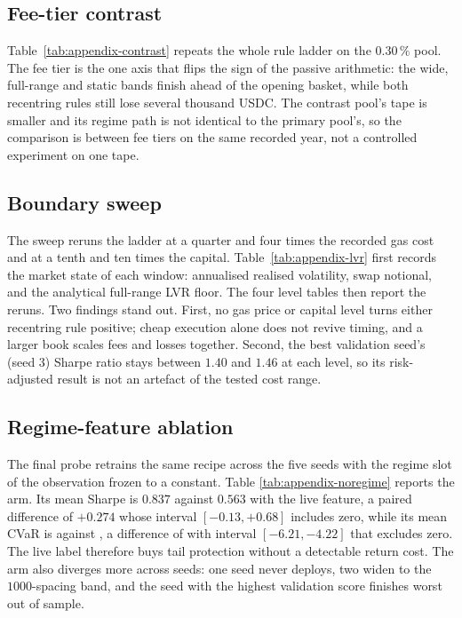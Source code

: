 

\subsection{Fee-tier contrast}

Table~\ref{tab:appendix-contrast} repeats the whole rule ladder on the
$0.30\,\%$ pool. The fee tier is the one axis that flips the sign of the
passive arithmetic: the wide, full-range and static bands finish ahead of the
opening basket, while both recentring rules still lose several thousand USDC.
The contrast pool's tape is smaller and its regime path is not identical to
the primary pool's, so the comparison is between fee tiers on the same
recorded year, not a controlled experiment on one tape.



\subsection{Boundary sweep}

The sweep reruns the ladder at a quarter and four times the recorded gas cost
and at a tenth and ten times the capital. Table~\ref{tab:appendix-lvr} first
records the market state of each window: annualised realised volatility,
swap notional, and the analytical full-range LVR floor. The four level tables
then report the reruns. Two findings stand out. First, no gas price or capital
level turns either recentring rule positive; cheap execution alone does not
revive timing, and a larger book scales fees and losses together. Second, the
best validation seed's (seed 3) Sharpe ratio stays between $1.40$ and $1.46$
at each level, so its risk-adjusted result is not an artefact of the tested
cost range.



\subsection{Regime-feature ablation}

The final probe retrains the same recipe across the five seeds with the regime
slot of the observation frozen to a constant. Table
\ref{tab:appendix-noregime} reports the arm. Its mean Sharpe is $0.837$ against
$0.563$ with the live feature, a paired difference of $+0.274$ whose interval
$[-0.13,+0.68]$ includes zero, while its mean CVaR is  against
, a difference of  with interval $[-6.21,-4.22]$ that
excludes zero. The live label therefore buys tail protection without a
detectable return cost. The arm also diverges more across seeds: one seed
never deploys, two widen to the $1000$-spacing band, and the seed with the
highest validation score finishes worst out of sample.



